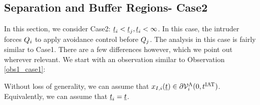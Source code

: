\subsection{Separation and Buffer Regions- Case2} \label{sec:case2}
In this section, we consider Case2: $\underline{t}_i < \underline{t}_j, \underline{t}_i <\infty$. In this case, the intruder forces $Q_i$ to apply avoidance control before $Q_j$. The analysis in this case is fairly similar to Case1. There are a few differences however, which we point out wherever relevant. We start with an observation similar to Observation \ref{obs1_case1}:
\begin{observation} \label{obs1_case2}
Without loss of generality, we can assume that $x_{I, i}(\underline{t}) \in \partial \mathcal{V}^{\text{A}}_{i}(0, t^\text{IAT})$. Equivalently, we can assume that $\underline{t}_i = \underline{t}$.
\end{observation}